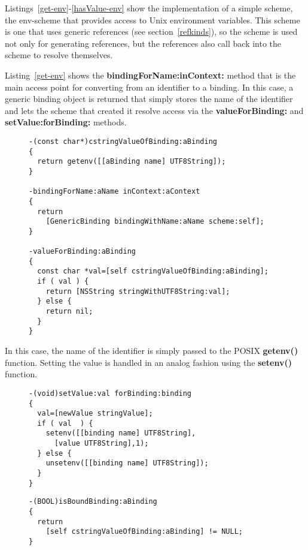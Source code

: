 \documentclass[preprint,authoryear]{llncs}
\begin{document}
Listings~\ref{get-env}-\ref{hasValue-env} show the implementation of a simple scheme,
the env-scheme that provides access to Unix environment variables.  This scheme is
one that uses generic references (see section~\ref{refkinds}), so the scheme is used
not only for generating references, but the references also call back into the scheme
to resolve themselves.

Listing~\ref{get-env} 
shows the {\bf bindingForName:inContext:} method that is the main access point for
converting from an identifier to a binding.  In this case, a generic binding object is returned
that simply stores the name of the identifier and lets the scheme that created it resolve
access via the {\bf valueForBinding:} and {\bf setValue:forBinding:} methods.


\begin{figure}[htbp]
\begin{lstlisting}[style=L,label=get-env,caption=Basic lookup in env: scheme.]
-(const char*)cstringValueOfBinding:aBinding
{
  return getenv([[aBinding name] UTF8String]);
}

-bindingForName:aName inContext:aContext
{
  return
    [GenericBinding bindingWithName:aName scheme:self];
}

-valueForBinding:aBinding
{
  const char *val=[self cstringValueOfBinding:aBinding];
  if ( val ) {
    return [NSString stringWithUTF8String:val];
  } else {
    return nil;
  }
}
\end{lstlisting}
\end{figure}

In this case, the name of the identifier is simply passed to the POSIX {\bf getenv()} function.
Setting the value is handled in an analog fashion using the {\bf setenv()} function.


\begin{figure}[htbp]
\begin{lstlisting}[style=L,label=setvalue-env,caption=Set value in env: scheme.]
-(void)setValue:val forBinding:binding
{
  val=[newValue stringValue];
  if ( val  ) {
    setenv([[binding name] UTF8String],
      [value UTF8String],1);
  } else {
    unsetenv([[binding name] UTF8String]);
  }
}
\end{lstlisting}
\end{figure}


\begin{figure}[htbp]
\begin{lstlisting}[style=L,label=hasValue-env,caption=Checking for presence of value in env: scheme.]
-(BOOL)isBoundBinding:aBinding
{
  return 
    [self cstringValueOfBinding:aBinding] != NULL;
}
\end{lstlisting}
\end{figure}
\end{document}
